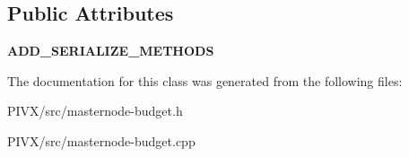 \subsection*{Public Attributes}
\begin{DoxyCompactItemize}
\item 
\mbox{\label{class_c_finalized_budget_broadcast_a543ef11ceec3a6488050d62a7e27a465}} 
{\bfseries A\+D\+D\+\_\+\+S\+E\+R\+I\+A\+L\+I\+Z\+E\+\_\+\+M\+E\+T\+H\+O\+DS}
\end{DoxyCompactItemize}


The documentation for this class was generated from the following files\+:\begin{DoxyCompactItemize}
\item 
P\+I\+V\+X/src/masternode-\/budget.\+h\item 
P\+I\+V\+X/src/masternode-\/budget.\+cpp\end{DoxyCompactItemize}
